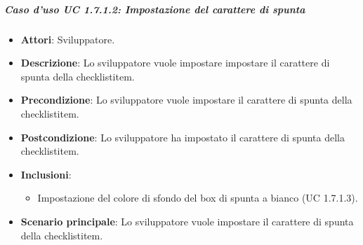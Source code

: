 \subparagraph{Caso d'uso UC 1.7.1.2: Impostazione del carattere di spunta}

\FloatBarrier
\begin{itemize}
\item\textbf{Attori}: Sviluppatore.
\item\textbf{Descrizione}: Lo sviluppatore vuole impostare impostare il carattere di spunta della checklistitem.
\item\textbf{Precondizione}: Lo sviluppatore vuole impostare il carattere di spunta della checklistitem.
\item\textbf{Postcondizione}: Lo sviluppatore ha impostato il carattere di spunta della checklistitem.
\item \textbf{Inclusioni}: 
\begin{itemize}
\item Impostazione del colore di sfondo del box di spunta a bianco (UC 1.7.1.3).
\end{itemize}
\item\textbf{Scenario principale}: Lo sviluppatore vuole impostare il carattere di spunta della checklistitem.
\end{itemize}